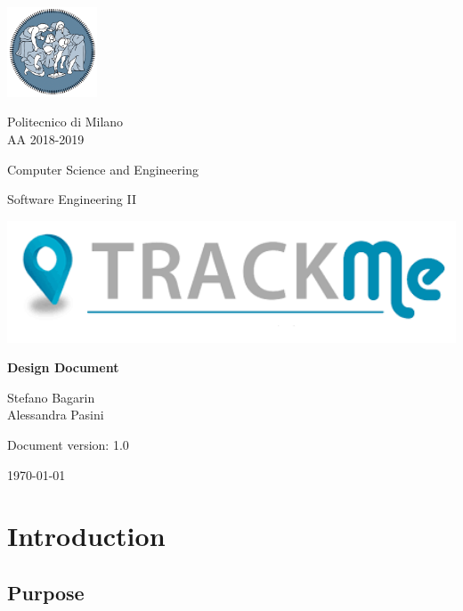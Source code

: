 \documentclass[a4paper,12pt]{report}
\begin{document}
	\begin{titlepage}
		\centering
		\includegraphics[width=0.20\textwidth]{./pictures/logo_polimi.png}\par

		{Politecnico di Milano \\ AA 2018-2019} \par
		\vspace{1.5cm}

		{Computer Science and Engineering}\par
		\Large{Software Engineering II}\par
		\vspace{1.0cm}

		\includegraphics[width=1.00\textwidth]{./pictures/logo_trackme.png}\par
		{\LARGE \textbf{Design Document} \par}
		\vspace{1.0cm}
		{\Large Stefano Bagarin\\ Alessandra Pasini\par}
		\vspace{2cm}
		\vfill

		{\large Document version: 1.0\par}
		{\large \today \par}
	\end{titlepage}

	\tableofcontents

	\chapter{Introduction}
	\label{ch:Introduction}

	\section{Purpose}
	
\end{document}
